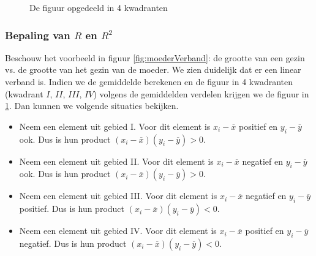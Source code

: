 
\begin{figure}[t]%
  \caption{De figuur opgedeeld in 4 kwadranten}%
  \label{fig:kwadranten}%
\end{figure}

\subsubsection{Bepaling van $R$ en $R^{2}$}
\label{sec:determinatiecoef}
Beschouw het voorbeeld in figuur \ref{fig:moederVerband}:  de grootte van een gezin vs. de grootte van het gezin van de moeder. We zien duidelijk dat er een linear verband is. Indien we de gemiddelde berekenen en de figuur in 4 kwadranten (kwadrant $I$, $II$, $III$, $IV$) volgens de gemiddelden verdelen krijgen we de figuur in \ref{fig:kwadranten}.  Dan kunnen we volgende situaties bekijken.

\begin{itemize}
  \item Neem een element uit gebied I. Voor dit element is $x_{i} - \overline{x}$ positief en $y_{i} - \overline{y}$ ook. Dus is hun product $(x_{i} - \overline{x}) (y_{i} - \overline{y}) > 0$.
  \item Neem een element uit gebied II. Voor dit element is $x_{i} - \overline{x}$ negatief en $y_{i} - \overline{y}$ ook. Dus is hun product $(x_{i} - \overline{x}) (y_{i} - \overline{y}) > 0$.
  \item Neem een element uit gebied III. Voor dit element is $x_{i} - \overline{x}$ negatief en $y_{i} - \overline{y}$ positief. Dus is hun product $(x_{i} - \overline{x}) (y_{i} - \overline{y}) < 0$.
  \item Neem een element uit gebied IV. Voor dit element is $x_{i} - \overline{x}$ positief en $y_{i} - \overline{y}$ negatief. Dus is hun product $(x_{i} - \overline{x}) (y_{i} - \overline{y}) < 0$.
\end{itemize}

